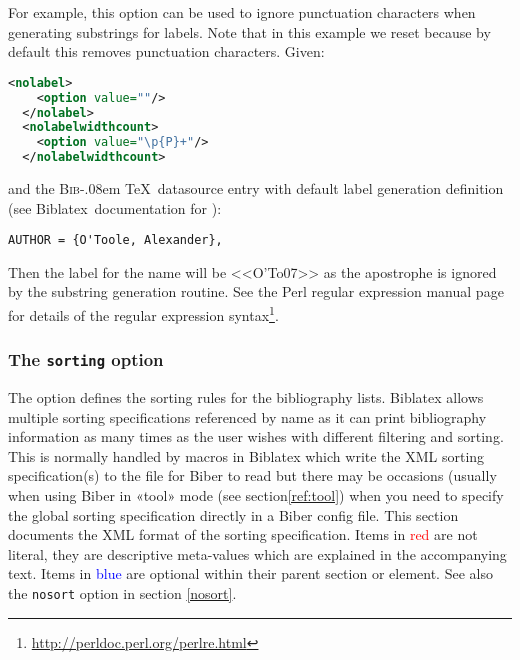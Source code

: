 \documentclass{ltxdockit}
\def\BibTeX{\textsc{Bib}\kern-.08em \TeX}
\newcommand*{\biber}{Biber\xspace}
\newcommand*{\biblatex}{Biblatex\xspace}
\begin{document}
For example, this option can be used to ignore punctuation characters when
generating substrings for labels. Note that in this example we reset
 because by default this removes punctuation characters. Given:

\begin{lstlisting}[language=xml]
  <nolabel>
    <option value=""/> 
  </nolabel>
  <nolabelwidthcount>
    <option value="\p{P}+"/> 
  </nolabelwidthcount>
\end{lstlisting}

\noindent and the \BibTeX\ datasource entry with default label generation
definition (see \biblatex\ documentation for ):

\begin{verbatim}
AUTHOR = {O'Toole, Alexander},
\end{verbatim}

\noindent Then the label for the name will be <<O'To07>> as the apostrophe
is ignored by the substring generation routine. See the Perl regular expression
manual page for details of the regular expression
syntax\footnote{\url{http://perldoc.perl.org/perlre.html}}.
\bigskip
\subsubsection{The \texttt{sorting} option}\label{sorting}

The  option defines the sorting rules for the bibliography
lists. \biblatex allows multiple sorting specifications referenced by name
as it can print bibliography information as many times as the user wishes
with different filtering and sorting. This is normally handled by macros in
\biblatex which write the XML sorting specification(s) to the 
file for \biber to read but there may be occasions (usually when using
\biber in «tool» mode (see section\ref{ref:tool}) when you need to specify the
global sorting specification directly in a \biber config file. This section
documents the XML format of the sorting specification. Items in
\textcolor{red}{red} are not literal, they are descriptive meta-values
which are explained in the accompanying text. Items in
\textcolor{blue}{blue} are optional within their parent section or element.
See also the \texttt{nosort} option in section \ref{nosort}.
\end{document}
